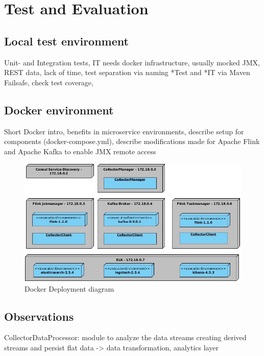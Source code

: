 \chapter{Test and Evaluation}
\label{ch:evaluation}
\section{Local test environment}

Unit- and Integration tests, IT needs docker infrastructure, usually mocked JMX, REST data,
lack of time, test separation via naming *Test and *IT via Maven Failsafe, check test coverage,

\section{Docker environment}

Short Docker intro, benefits in microservice environments, describe setup for components (docker-compose.yml),
describe modifications made for Apache Flink and Apache Kafka to enable JMX remote access

\begin{figure}[H]
	\centering
	\includegraphics[width=1.0\textwidth]{../uml/deployment-diagram.jpg}
	\caption{Docker Deployment diagram}
	\label{img:deployment-diagram}
\end{figure}

\section{Observations}

CollectorDataProcessor: module to analyze the data streams creating derived streams and persist flat
data -> data transformation, analytics layer

